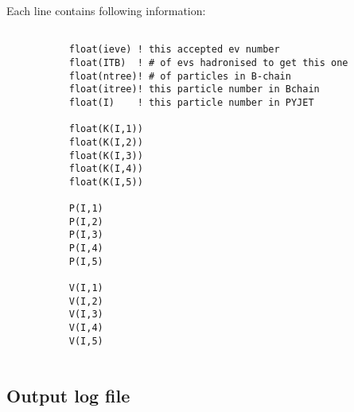 Each line contains following information:
\begin{verbatim}

           float(ieve) ! this accepted ev number
           float(ITB)  ! # of evs hadronised to get this one
           float(ntree)! # of particles in B-chain
           float(itree)! this particle number in Bchain
           float(I)    ! this particle number in PYJET

           float(K(I,1))
           float(K(I,2))
           float(K(I,3))
           float(K(I,4))
           float(K(I,5))

           P(I,1)
           P(I,2)
           P(I,3)
           P(I,4)
           P(I,5)

           V(I,1)
           V(I,2)
           V(I,3)
           V(I,4)
           V(I,5)


\end{verbatim}



\subsection{Output log file}



